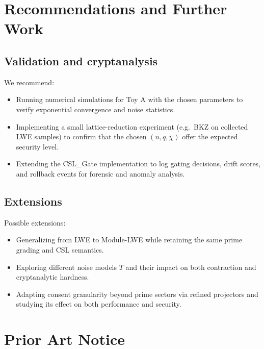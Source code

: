 \documentclass[11pt]{article}
\begin{document}
\section{Recommendations and Further Work}

\subsection{Validation and cryptanalysis}

We recommend:

\begin{itemize}
    \item Running numerical simulations for Toy A with the chosen parameters
    to verify exponential convergence and noise statistics.

    \item Implementing a small lattice-reduction experiment (e.g.\ BKZ on
    collected LWE samples) to confirm that the chosen $(n,q,\chi)$ offer the
    expected security level.

    \item Extending the CSL\_Gate implementation to log gating decisions,
    drift scores, and rollback events for forensic and anomaly analysis.
\end{itemize}

\subsection{Extensions}

Possible extensions:

\begin{itemize}
    \item Generalizing from LWE to Module-LWE while retaining the same prime
    grading and CSL semantics.\cite{pqc-lwe}

    \item Exploring different noise models $T$ and their impact on both
    contraction and cryptanalytic hardness.

    \item Adapting consent granularity beyond prime sectors via refined
    projectors and studying its effect on both performance and security.
\end{itemize}

\section*{Prior Art Notice}
\end{document}
